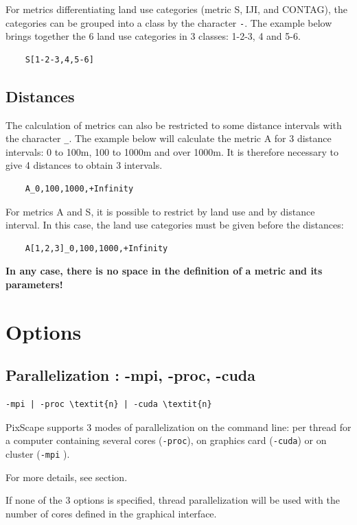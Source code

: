 \documentclass{report}
\begin{document}
For metrics differentiating land use categories (metric S, IJI, and CONTAG), the categories can be grouped into a class by the character \verb|-|. 
The example below brings together the 6 land use categories in 3 classes: 1-2-3, 4 and 5-6.
\begin{Verbatim}
	S[1-2-3,4,5-6]
\end{Verbatim}

\subsection{Distances}
The calculation of metrics can also be restricted to some distance intervals with the character \verb|_|. The example below will calculate the metric A for 3 distance intervals: 0 to 100m, 100 to 1000m and over 1000m. It is therefore necessary to give 4 distances to obtain 3 intervals.
\begin{Verbatim}
	A_0,100,1000,+Infinity
\end{Verbatim}

For metrics A and S, it is possible to restrict by land use and by distance interval. In this case, the land use categories must be given before the distances:
\begin{Verbatim}
	A[1,2,3]_0,100,1000,+Infinity
\end{Verbatim}

\textbf{In any case, there is no space in the definition of a metric and its parameters!}

\section{Options}

\subsection{Parallelization : -mpi, -proc, -cuda}
\begin{Verbatim}[commandchars=\\\{\}]
-mpi | -proc \textit{n} | -cuda \textit{n}
\end{Verbatim}

PixScape supports 3 modes of parallelization on the command line: per thread for a computer containing several cores (\verb|-proc|), on graphics card (\verb|-cuda|) or on cluster (\verb|-mpi| ).

For more details, see  section.

If none of the 3 options is specified, thread parallelization will be used with the number of cores defined in the graphical interface.
\end{document}
